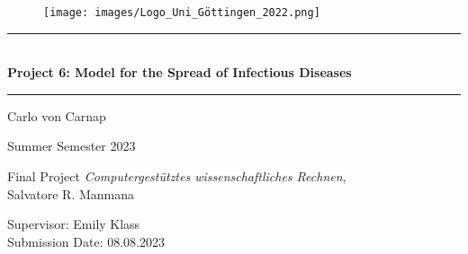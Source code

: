 \begin{titlepage}
    \centering
    \vspace*{1.5cm}
    \begin{figure}[H]
        \texttt{[image: images/Logo\_Uni\_Göttingen\_2022.png]}
    \end{figure}
    \vspace*{2.2cm}
    
    \rule{\textwidth}{1pt}\\[0.5cm]
    {\huge \bfseries
      Project 6: Model for the Spread of Infectious Diseases}\\
    \rule{\textwidth}{1pt}
    
    \vspace*{2.7cm}
    
    {\large Carlo von Carnap\\
    
    \vspace*{0.7cm}

    Summer Semester 2023}
    
    \vspace*{4cm}

    {\large Final Project \textit{Computergestütztes wissenschaftliches Rechnen}, \\
    Salvatore R. Manmana

    \vspace*{0.7cm}
    
    Supervisor: Emily Klass \\
    Submission Date: 08.08.2023}

    \end{titlepage}